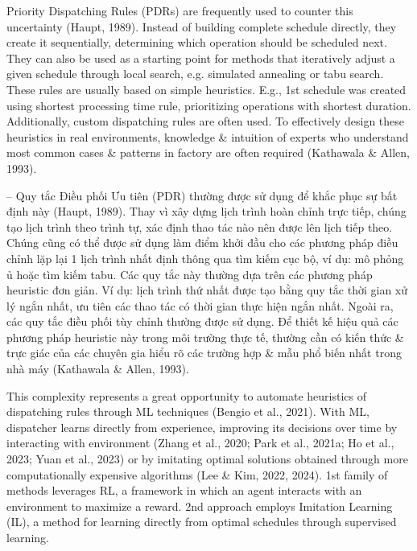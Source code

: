 \documentclass{article}
\begin{document}
\begin{itemize}
    Priority Dispatching Rules (PDRs) are frequently used to counter this uncertainty (Haupt, 1989). Instead of building complete schedule directly, they create it sequentially, determining which operation should be scheduled next. They can also be used as a starting point for methods that iteratively adjust a given schedule through local search, e.g. simulated annealing or tabu search. These rules are usually based on simple heuristics. E.g., 1st schedule was created using shortest processing time rule, prioritizing operations with shortest duration. Additionally, custom dispatching rules are often used. To effectively design these heuristics in real environments, knowledge \& intuition of experts who understand most common cases \& patterns in factory are often required (Kathawala \& Allen, 1993).

    -- Quy tắc Điều phối Ưu tiên (PDR) thường được sử dụng để khắc phục sự bất định này (Haupt, 1989). Thay vì xây dựng lịch trình hoàn chỉnh trực tiếp, chúng tạo lịch trình theo trình tự, xác định thao tác nào nên được lên lịch tiếp theo. Chúng cũng có thể được sử dụng làm điểm khởi đầu cho các phương pháp điều chỉnh lặp lại 1 lịch trình nhất định thông qua tìm kiếm cục bộ, ví dụ: mô phỏng ủ hoặc tìm kiếm tabu. Các quy tắc này thường dựa trên các phương pháp heuristic đơn giản. Ví dụ: lịch trình thứ nhất được tạo bằng quy tắc thời gian xử lý ngắn nhất, ưu tiên các thao tác có thời gian thực hiện ngắn nhất. Ngoài ra, các quy tắc điều phối tùy chỉnh thường được sử dụng. Để thiết kế hiệu quả các phương pháp heuristic này trong môi trường thực tế, thường cần có kiến thức \& trực giác của các chuyên gia hiểu rõ các trường hợp \& mẫu phổ biến nhất trong nhà máy (Kathawala \& Allen, 1993).

    This complexity represents a great opportunity to automate heuristics of dispatching rules through ML techniques (Bengio et al., 2021). With ML, dispatcher learns directly from experience, improving its decisions over time by interacting with environment (Zhang et al., 2020; Park et al., 2021a; Ho et al., 2023; Yuan et al., 2023) or by imitating optimal solutions obtained through more computationally expensive algorithms (Lee \& Kim, 2022, 2024). 1st family of methods leverages RL, a framework in which an agent interacts with an environment to maximize a reward. 2nd approach employs Imitation Learning (IL), a method for learning directly from optimal schedules through supervised learning.


\end{itemize}
\end{document}
